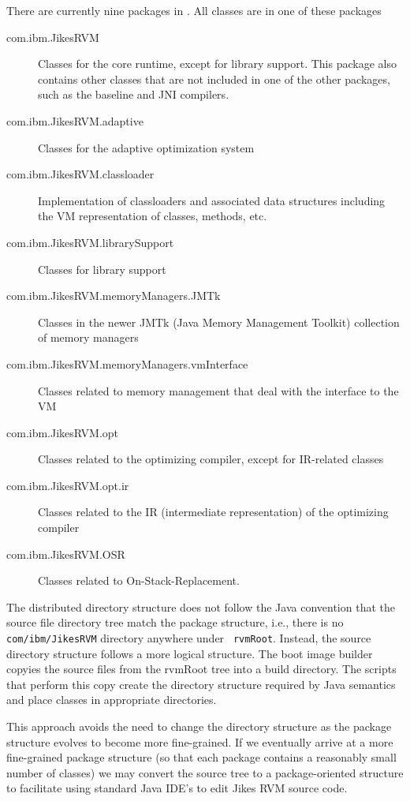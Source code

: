 There are currently nine packages in \jrvm. All classes are in
one of these packages
\begin{description}
\item [com.ibm.JikesRVM] Classes for the core runtime, except for library
support.  This package also contains other classes that are not
included in one of the other packages, such as the baseline and JNI
compilers. 

\item [com.ibm.JikesRVM.adaptive] Classes for the adaptive optimization system

\item [com.ibm.JikesRVM.classloader] Implementation of classloaders
and associated data structures including the VM representation of classes,
methods, etc. 

\item [com.ibm.JikesRVM.librarySupport] Classes for library support

\item [com.ibm.JikesRVM.memoryManagers.JMTk] Classes in the newer JMTk
(Java Memory Management Toolkit) collection of memory managers

\item [com.ibm.JikesRVM.memoryManagers.vmInterface] Classes related to
memory management that deal with the interface to the VM

\item [com.ibm.JikesRVM.opt] Classes related to the optimizing
compiler, except for IR-related classes

\item [com.ibm.JikesRVM.opt.ir] Classes related to the IR
(intermediate representation) of the optimizing compiler

\item [com.ibm.JikesRVM.OSR] Classes related to On-Stack-Replacement. 

\end{description}

The distributed directory structure
does not follow the Java convention that the source file directory tree
match the package structure, i.e.,
there is no {\tt com/ibm/JikesRVM} directory anywhere under {\tt
rvmRoot}.  Instead, the source directory structure follows a more logical 
structure.  The boot image builder
copyies the source files from the rvmRoot tree into a build
directory.  The scripts that perform this copy create the directory
structure required by Java semantics and place classes in appropriate
directories.

This approach avoids the need to change the directory structure as the
package structure evolves to become more fine-grained. If we
eventually arrive at a more fine-grained package structure (so that
each package contains a reasonably small number of classes) we may
convert the source tree to a package-oriented structure to facilitate
using standard Java IDE's to edit Jikes RVM source code.
